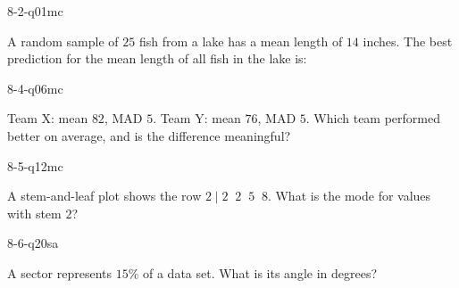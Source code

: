 \begin{practiceQuestion}{8-2-q01}{mc}
\begin{questionText}
A random sample of $25$ fish from a lake has a mean length of $14$ inches. The best prediction for the mean length of all fish in the lake is:
\end{questionText}
\end{practiceQuestion}

\begin{practiceQuestion}{8-4-q06}{mc}
\begin{questionText}
Team X: mean $82$, MAD $5$. Team Y: mean $76$, MAD $5$. Which team performed better on average, and is the difference meaningful?
\end{questionText}
\end{practiceQuestion}

\begin{practiceQuestion}{8-5-q12}{mc}
\begin{questionText}
A stem-and-leaf plot shows the row $2 \mid 2\;\;2\;\;5\;\;8$. What is the mode for values with stem $2$?
\end{questionText}
\end{practiceQuestion}

\begin{practiceQuestion}{8-6-q20}{sa}
\begin{questionText}
A sector represents $15\%$ of a data set. What is its angle in degrees?
\end{questionText}
\end{practiceQuestion}

